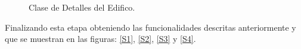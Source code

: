   \begin{figure}[h!]
 	\begin{center}
 		\caption{Clase de Detalles del Edifico.}
 		\label{detalleedificio}
 	\end{center}
 \end{figure}
 
 Finalizando esta etapa obteniendo las funcionalidades descritas anteriormente y que se muestran en las figuras: \ref{S1}, \ref{S2}, \ref{S3} y \ref{S4}. \\
 
